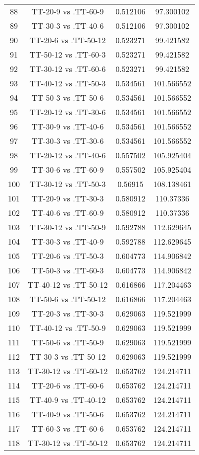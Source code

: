 \documentclass[a4paper,10pt]{article}
\begin{document}
\begin{landscape}
\begin{table}[!htp]
\begin{tabular}{cccc}
88&TT-20-9 vs .TT-60-9&0.512106&97.300102\\
89&TT-30-3 vs .TT-40-6&0.512106&97.300102\\
90&TT-20-6 vs .TT-50-12&0.523271&99.421582\\
91&TT-50-12 vs .TT-60-3&0.523271&99.421582\\
92&TT-30-12 vs .TT-60-6&0.523271&99.421582\\
93&TT-40-12 vs .TT-50-3&0.534561&101.566552\\
94&TT-50-3 vs .TT-50-6&0.534561&101.566552\\
95&TT-20-12 vs .TT-30-6&0.534561&101.566552\\
96&TT-30-9 vs .TT-40-6&0.534561&101.566552\\
97&TT-30-3 vs .TT-30-6&0.534561&101.566552\\
98&TT-20-12 vs .TT-40-6&0.557502&105.925404\\
99&TT-30-6 vs .TT-60-9&0.557502&105.925404\\
100&TT-30-12 vs .TT-50-3&0.56915&108.138461\\
101&TT-20-9 vs .TT-30-3&0.580912&110.37336\\
102&TT-40-6 vs .TT-60-9&0.580912&110.37336\\
103&TT-30-12 vs .TT-50-9&0.592788&112.629645\\
104&TT-30-3 vs .TT-40-9&0.592788&112.629645\\
105&TT-20-6 vs .TT-50-3&0.604773&114.906842\\
106&TT-50-3 vs .TT-60-3&0.604773&114.906842\\
107&TT-40-12 vs .TT-50-12&0.616866&117.204463\\
108&TT-50-6 vs .TT-50-12&0.616866&117.204463\\
109&TT-20-3 vs .TT-30-3&0.629063&119.521999\\
110&TT-40-12 vs .TT-50-9&0.629063&119.521999\\
111&TT-50-6 vs .TT-50-9&0.629063&119.521999\\
112&TT-30-3 vs .TT-50-12&0.629063&119.521999\\
113&TT-30-12 vs .TT-60-12&0.653762&124.214711\\
114&TT-20-6 vs .TT-60-6&0.653762&124.214711\\
115&TT-40-9 vs .TT-40-12&0.653762&124.214711\\
116&TT-40-9 vs .TT-50-6&0.653762&124.214711\\
117&TT-60-3 vs .TT-60-6&0.653762&124.214711\\
118&TT-30-12 vs .TT-50-12&0.653762&124.214711\\

\end{tabular}
\end{table}
\end{landscape}
\end{document}
